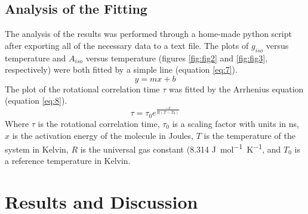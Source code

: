 \documentclass[twocolumn]{article}
\begin{document}
\subsection{Analysis of the Fitting}
The analysis of the results was performed through a home-made python script after exporting all of the necessary data to a text file. 
\indent
The plots of $g_{iso}$ versus temperature and $A_{iso}$ versus temperature (figures \ref{fig:fig2} and \ref{fig:fig3}, respectively) were both fitted by a simple line (equation \ref{eq:7}). 
\begin{equation}
y=mx+b
\label{eq:7}
\end{equation}
The plot of the rotational correlation time $\tau$ was fitted by the Arrhenius equation (equation \ref{eq:8}). 
\begin{equation}
\tau=\tau_0e^{\frac{-x}{R(T-T_0)}}
\label{eq:8}
\end{equation}
Where $\tau$ is the rotational correlation time, $\tau_0$ is a scaling factor with units in \si{ns}, $x$ is the activation energy of the molecule in Joules, $T$ is the temperature of the system in Kelvin, $R$ is the universal gas constant (8.314 \si{J.mol^{-1}.K^{-1}}, and $T_0$ is a reference temperature in Kelvin.
\section{Results and Discussion}
\label{sec:results}
\end{document}
